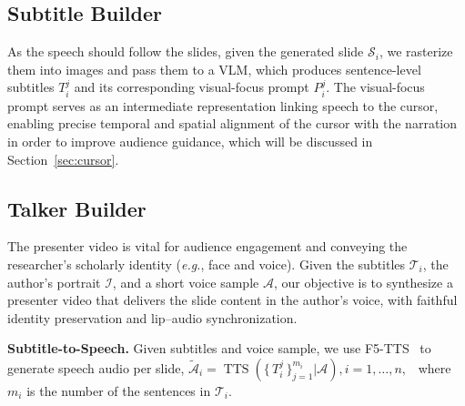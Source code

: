 \vspace{-0.4\baselineskip} 
\subsection{Subtitle Builder}
\vspace{-0.4\baselineskip} 
As the speech should follow the slides, given the generated slide $\mathcal{S}_i$, we rasterize them into images and pass them to a VLM, which produces sentence-level subtitles $T_{i}^{j}$ and its corresponding visual-focus prompt $P_{i}^{j}$. The visual-focus prompt serves as an intermediate representation linking speech to the cursor, enabling precise temporal and spatial alignment of the cursor with the narration in order to improve audience guidance, which will be discussed in Section~\ref{sec:cursor}.

\vspace{-0.5\baselineskip} 
\subsection{Talker Builder}
\vspace{-0.5\baselineskip} 
The presenter video is vital for audience engagement and conveying the researcher’s scholarly identity (\textit{e.g.}, face and voice). Given the subtitles $\mathcal{T}_i$, the author’s portrait $\mathcal{I}$, and a short voice sample $\mathcal{A}$, our objective is to synthesize a presenter video that delivers the slide content in the author’s voice, with faithful identity preservation and lip–audio synchronization.

\vspace{-0.4\baselineskip}
\noindent\textbf{Subtitle-to-Speech.} Given subtitles and voice sample, we use F5-TTS~\cite{tts-f5} to generate speech audio per slide, \begingroup \small $
\widetilde{\mathcal{A}}_i = \operatorname{TTS}\!\left( \{\, T_{i}^{j} \,\}_{j=1}^{m_i} |\mathcal{A}\right), i=1,\ldots,n, $
\endgroup ~where $m_i$ is the number of the sentences in $\mathcal{T}_i$.

